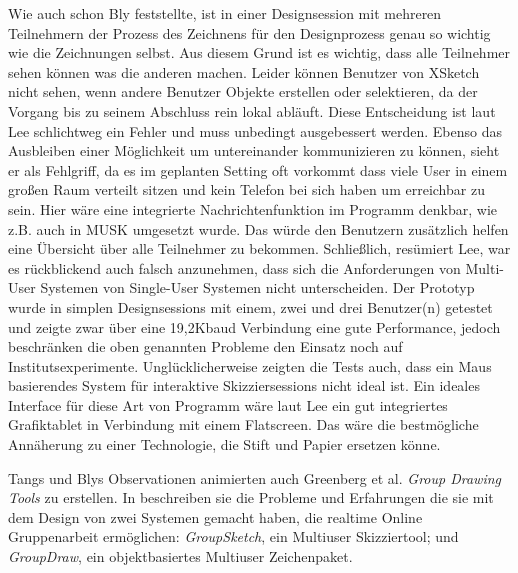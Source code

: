 Wie auch schon Bly feststellte, ist in einer Designsession mit mehreren Teilnehmern der Prozess des Zeichnens für den Designprozess genau so wichtig wie die Zeichnungen selbst. \cite{Bly:1988:UDS:62266.62286} Aus diesem Grund ist es wichtig, dass alle Teilnehmer sehen können was die anderen machen. Leider können Benutzer von XSketch nicht sehen, wenn andere Benutzer Objekte erstellen oder selektieren, da der Vorgang bis zu seinem Abschluss rein lokal abläuft. Diese Entscheidung ist laut Lee schlichtweg ein Fehler und muss unbedingt ausgebessert werden. Ebenso das Ausbleiben einer Möglichkeit um untereinander kommunizieren zu können, sieht er als Fehlgriff, da es im geplanten Setting oft vorkommt dass viele User in einem großen Raum verteilt sitzen und kein Telefon bei sich haben um erreichbar zu sein. Hier wäre eine integrierte Nachrichtenfunktion im Programm denkbar, wie z.B. auch in MUSK \cite{Crampton:1987} umgesetzt wurde. Das würde den Benutzern zusätzlich helfen eine Übersicht über alle Teilnehmer zu bekommen. 
Schließlich, resümiert Lee, war es rückblickend auch falsch anzunehmen, dass sich die Anforderungen von Multi-User Systemen von Single-User Systemen nicht unterscheiden. Der Prototyp wurde in simplen Designsessions mit einem, zwei und drei Benutzer(n) getestet und zeigte zwar über eine 19,2Kbaud Verbindung eine gute Performance, jedoch beschränken die oben genannten Probleme den Einsatz noch auf Institutsexperimente.
Unglücklicherweise zeigten die Tests auch, dass ein Maus basierendes System für interaktive Skizziersessions nicht ideal ist. Ein ideales Interface für diese Art von Programm wäre laut Lee ein gut integriertes Grafiktablet in Verbindung mit einem Flatscreen. Das wäre die bestmögliche Annäherung zu einer Technologie, die Stift und Papier ersetzen könne.

\bigskip Tangs und Blys Observationen animierten auch Greenberg et al. \emph{Group Drawing Tools} zu erstellen. In \cite{Greenberg:1992p83} beschreiben sie die Probleme und Erfahrungen die sie mit dem Design von zwei Systemen gemacht haben, die realtime Online Gruppenarbeit ermöglichen: \emph{GroupSketch}, ein Multiuser Skizziertool; und \emph{GroupDraw}, ein objektbasiertes Multiuser Zeichenpaket.

